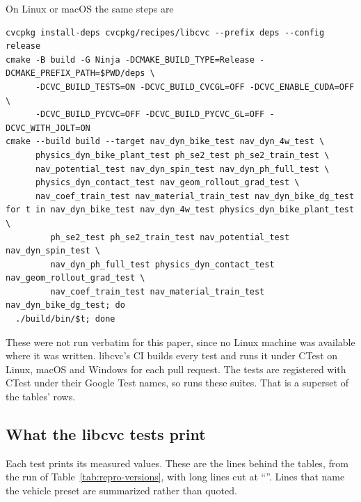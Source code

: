 \documentclass[11pt]{article}
\theoremstyle{remark}
\begin{document}
On Linux or macOS the same steps are
\begin{center}
\begin{minipage}{0.95\linewidth}
\small
\begin{verbatim}
cvcpkg install-deps cvcpkg/recipes/libcvc --prefix deps --config release
cmake -B build -G Ninja -DCMAKE_BUILD_TYPE=Release -DCMAKE_PREFIX_PATH=$PWD/deps \
      -DCVC_BUILD_TESTS=ON -DCVC_BUILD_CVCGL=OFF -DCVC_ENABLE_CUDA=OFF \
      -DCVC_BUILD_PYCVC=OFF -DCVC_BUILD_PYCVC_GL=OFF -DCVC_WITH_JOLT=ON
cmake --build build --target nav_dyn_bike_test nav_dyn_4w_test \
      physics_dyn_bike_plant_test ph_se2_test ph_se2_train_test \
      nav_potential_test nav_dyn_spin_test nav_dyn_ph_full_test \
      physics_dyn_contact_test nav_geom_rollout_grad_test \
      nav_coef_train_test nav_material_train_test nav_dyn_bike_dg_test
for t in nav_dyn_bike_test nav_dyn_4w_test physics_dyn_bike_plant_test \
         ph_se2_test ph_se2_train_test nav_potential_test nav_dyn_spin_test \
         nav_dyn_ph_full_test physics_dyn_contact_test nav_geom_rollout_grad_test \
         nav_coef_train_test nav_material_train_test nav_dyn_bike_dg_test; do
  ./build/bin/$t; done
\end{verbatim}
\end{minipage}
\end{center}
These were not run verbatim for this paper, since no Linux machine was available where it was
written. libcvc's CI builds every test and runs it under CTest on Linux, macOS and Windows for each
pull request. The tests are registered with CTest under their Google Test names, so
runs these suites. That is a superset of the tables' rows.

\subsection{What the libcvc tests print}
Each test prints its measured values. These are the lines behind the tables, from the run of
Table~\ref{tab:repro-versions}, with long lines cut at ``''. Lines that name the vehicle
preset are summarized rather than quoted.
\end{document}
